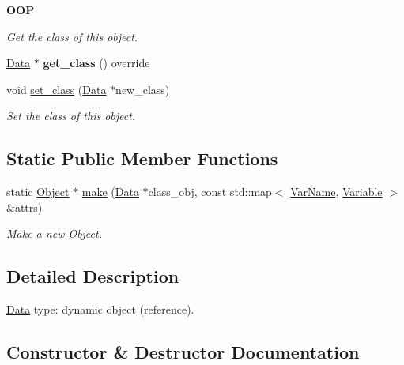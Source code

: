 \begin{Indent}{\bf O\+OP}\par
{\em Get the class of this object. }\begin{DoxyCompactItemize}
\item 
\hyperlink{classcreek_1_1_data}{Data} $\ast$ {\bfseries get\+\_\+class} () override\hypertarget{classcreek_1_1_object_ad36931e6eb1556f442b81358a1d41527}{}\label{classcreek_1_1_object_ad36931e6eb1556f442b81358a1d41527}

\item 
void \hyperlink{classcreek_1_1_object_a00d3dadced06b15dc68f6f0f45fb5eca}{set\+\_\+class} (\hyperlink{classcreek_1_1_data}{Data} $\ast$new\+\_\+class)\hypertarget{classcreek_1_1_object_a00d3dadced06b15dc68f6f0f45fb5eca}{}\label{classcreek_1_1_object_a00d3dadced06b15dc68f6f0f45fb5eca}

\begin{DoxyCompactList}\small\item\em Set the class of this object. \end{DoxyCompactList}\end{DoxyCompactItemize}
\end{Indent}
\subsection*{Static Public Member Functions}
\begin{DoxyCompactItemize}
\item 
static \hyperlink{classcreek_1_1_object}{Object} $\ast$ \hyperlink{classcreek_1_1_object_a3a770d8bfcd3dd375492dd08407a5b3f}{make} (\hyperlink{classcreek_1_1_data}{Data} $\ast$class\+\_\+obj, const std\+::map$<$ \hyperlink{classcreek_1_1_var_name}{Var\+Name}, \hyperlink{classcreek_1_1_variable}{Variable} $>$ \&attrs)
\begin{DoxyCompactList}\small\item\em Make a new {\ttfamily \hyperlink{classcreek_1_1_object}{Object}}. \end{DoxyCompactList}\end{DoxyCompactItemize}


\subsection{Detailed Description}
\hyperlink{classcreek_1_1_data}{Data} type\+: dynamic object (reference). 

\subsection{Constructor \& Destructor Documentation}
